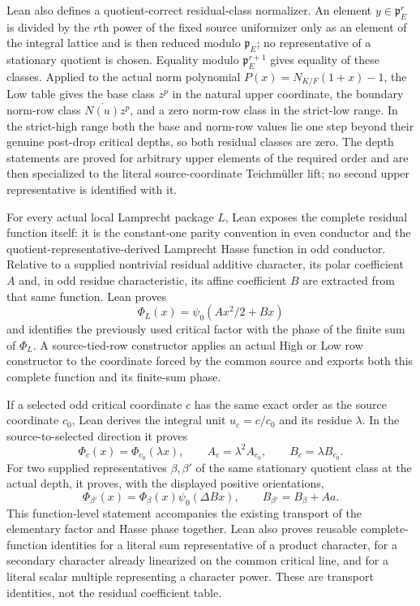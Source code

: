 \begin{definition}
Lean also defines a quotient-correct residual-class normalizer.  An element
$y\in\mathfrak p_E^r$ is divided by the $r$th power of the fixed source
uniformizer only as an element of the integral lattice and is then reduced
modulo $\mathfrak p_E$; no representative of a stationary quotient is
chosen.  Equality modulo $\mathfrak p_E^{r+1}$ gives equality of these
classes.  Applied to the actual norm polynomial
$P(x)=N_{K/F}(1+x)-1$, the Low table gives the base class $z^p$ in the
natural upper coordinate, the boundary norm-row class
$\overline{N(u)}z^p$, and a zero norm-row class in the strict-low range.
In the strict-high range both the base and norm-row values lie one step
beyond their genuine post-drop critical depths, so both residual classes
are zero.  The depth statements are proved for arbitrary upper elements of
the required order and are then specialized to the literal source-coordinate
Teichm\"uller lift; no second upper representative is identified with it.

For every actual local Lamprecht package $L$, Lean exposes the complete
residual function itself: it is the constant-one parity convention in even
conductor and the quotient-representative-derived Lamprecht Hasse function
in odd conductor.  Relative to a supplied nontrivial residual additive
character, its polar coefficient $A$ and, in odd residue characteristic,
its affine coefficient $B$ are extracted from that same function.  Lean
proves
\[
 \Phi_L(x)=\psi_0(Ax^2/2+Bx)
\]
and identifies the previously used critical factor with the phase of the
finite sum of $\Phi_L$.  A source-tied-row constructor applies an actual
High or Low row constructor to the coordinate forced by the common source
and exports both this complete function and its finite-sum phase.

If a selected odd critical coordinate $c$ has the same exact order as the
source coordinate $c_0$, Lean derives the integral unit $u_c=c/c_0$ and its
residue $\lambda$.  In the source-to-selected direction it proves
\[
 \Phi_c(x)=\Phi_{c_0}(\lambda x),
 \qquad A_c=\lambda^2A_{c_0},
 \qquad B_c=\lambda B_{c_0}.
\]
For two supplied representatives $\beta,\beta'$ of the same stationary
quotient class at the actual depth, it proves, with the displayed positive
orientations,
\[
 \Phi_{\beta'}(x)=\Phi_\beta(x)\psi_0(\Delta Bx),
 \qquad B_{\beta'}=B_\beta+A a.
\]
This function-level statement accompanies the existing transport of the
elementary factor and Hasse phase together.  Lean also proves reusable
complete-function identities for a literal sum representative of a product
character, for a secondary character already linearized on the common
critical line, and for a literal scalar multiple representing a character
power.  These are transport identities, not the residual coefficient table.


\end{definition}
